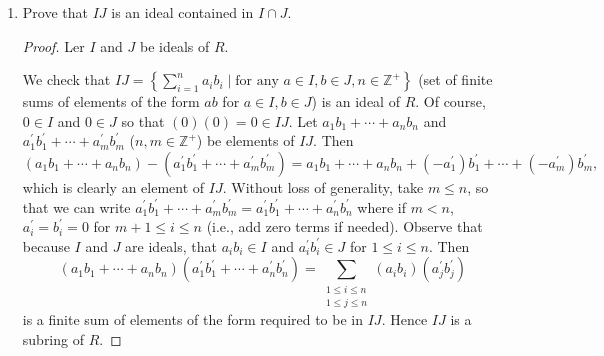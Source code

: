 \documentclass[11pt]{article}
\newcommand{\cbr}[1]{\left\{#1\right\}}
\begin{document}
\begin{enumerate}
\begin{enumerate}[label=\textbf{(\alph*)}]
\begin{proof}
            We check that $I+J = \cbr{a+b\mid a\in I, b\in J}$ is an ideal of $R$. It is clear that $I+J$ is a subring of $R$: We have $0\in I+J$, since $0\in I$ and $0\in J$, and $0+0= 0$. For any $a,a^{\prime}\in I$ and any $b,b^{\prime}\in J$ we have $(a+b) - (a^{\prime} + b^{\prime}) = (a-a^{\prime})+ (b-b^{\prime})\in I+J$ since $a-a^{\prime}\in I$ and $b-b^{\prime}\in J$. We also have $(a+b)(a^{\prime}+b^{\prime}) = a(a^{\prime}+b^{\prime}) + b(a^{\prime} + b^{\prime}) \in I+J$ since $a(a^{\prime}+b^{\prime})\in I$ and $b(a^{\prime} + b^{\prime})\in J$ since $I$ and $J$ are ideals. Thus $I+J$ is a subring of $R$.
            
            For any $r\in R$ we have $r(a+b) = ra+rb \in I+J$, and $(a+b)r = ar+br\in I+J$, since $ar,ra\in I$ and $br,rb\in J$ due to $I$ and $J$ being ideals of $R$. Thus $I+J$ is an ideal of $R$.

            Let $K$ be any ideal of $R$ containing $I$ and $J$. Observe that $K$ is an additive subgroup of $R$; it follows that for any $a\in I$ and any $b\in J$, we have $a,b\in K$, so that $a+b\in K$. Hence $I+J\subseteq K$. Since $K$ was an arbitrary ideal containing $I$ and $J$, it follows that $I+J$ is the smallest ideal of $R$ containing $I$ and $J$.
        \end{proof}
        \item Prove that $IJ$ is an ideal contained in $I\cap J$.
        \begin{proof} Ler $I$ and $J$ be ideals of $R$.

            We check that $IJ = \cbr{\sum_{i=1}^n a_ib_i \mid \text{for any } a\in I, b\in J, n\in \mathbb{Z}^+}$ (set of finite sums of elements of the form $ab$ for $a\in I, b\in J$) is an ideal of $R$. Of course, $0\in I$ and $0\in J$ so that $(0)(0) = 0 \in IJ$. Let $a_1b_1 + \cdots + a_nb_n$ and $a^{\prime}_1b^{\prime}_1+ \cdots + a^{\prime}_mb^{\prime}_m$ ($n,m\in \mathbb{Z}^+$) be elements of $IJ$. Then \[(a_1b_1 + \cdots  +a_nb_n) - (a^{\prime}_1b^{\prime}_1+ \cdots + a^{\prime}_mb^{\prime}_m) = a_1b_1 + \cdots + a_nb_n + (-a^{\prime}_1)b^{\prime}_1 + \cdots + (-a^{\prime}_m)b^{\prime}_m,\] which is clearly an element of $IJ$. Without loss of generality, take $m\leq n$, so that we can write $a^{\prime}_1b^{\prime}_1+ \cdots + a^{\prime}_mb^{\prime}_m = a^{\prime}_1b^{\prime}_1+ \cdots + a^{\prime}_nb^{\prime}_n$ where if $m <n$, $a^{\prime}_i = b^{\prime}_i = 0$ for $m+1\leq i \leq n$ (i.e., add zero terms if needed). Observe that because $I$ and $J$ are ideals, that $a_ib_i\in I$ and $a^{\prime}_ib^{\prime}_i\in J$ for $1\leq i \leq n$. Then \[(a_1b_1 + \cdots + a_nb_n)(a^{\prime}_1b^{\prime}_1+ \cdots + a^{\prime}_nb^{\prime}_n) = \sum_{\substack{1\leq i \leq n \\ 1\leq j \leq n}} (a_ib_i)(a^{\prime}_jb^{\prime}_j)\] is a finite sum of elements of the form required to be in $IJ$. Hence $IJ$ is a subring of $R$.


\end{proof}
\end{enumerate}
\end{enumerate}
\end{document}
